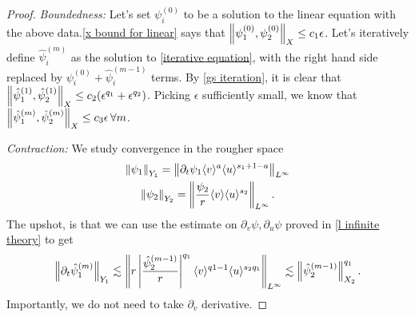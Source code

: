 \documentclass[11pt, oneside]{amsart}
\begin{document}
	\begin{proof}
		\textit{Boundedness:}
		Let's set $\psi_i^{(0)}$ to be a solution to the linear equation with the above data.\cref{x bound for linear} says that $\left\lVert \psi_1^{(0)},\psi_2^{(0)}\right\rVert_X\leq c_1\epsilon$. Let's iteratively define $\hat{\psi}^{(m)}_i$ as the solution to \eqref{iterative equation}, with the right hand side replaced by $\psi_i^{(0)}+\hat{\psi}_i^{(m-1)}$ terms. By \cref{gs iteration}, it is clear that $\left\lVert \hat{\psi}_1^{(1)},\hat{\psi}_2^{(1)}\right\rVert_X\leq c_2 (\epsilon^{q_1}+\epsilon^{q_2})$. Picking $\epsilon$ sufficiently small, we know that $\left\lVert \hat{\psi}_1^{(m)},\hat{\psi}_2^{(m)}\right\rVert_X\leq c_3\epsilon\,\forall m$.
		
		
		\textit{Contraction:} We study convergence in the rougher space
		\begin{equation*}
			\begin{gathered}
				\left\lVert \psi_1\right\rVert_{Y_1}=\left\lVert \partial_t\psi_1\langle v \rangle^{a}\langle u \rangle^{s_1+1-a}\right\rVert_{L^\infty}\\
				\left\lVert \psi_2\right\rVert_{Y_2}=\left\lVert \frac{\psi_2}{r}\langle v \rangle\langle u \rangle^{s_2}\right\rVert_{L^\infty}.
			\end{gathered}
		\end{equation*}
		The upshot, is that we can use the estimate on $\partial_v\psi,\partial_u\psi$ proved in \cref{l infinite theory} to get
		\begin{equation*}
			\begin{gathered}
				\left\lVert \partial_t\hat{\psi}_1^{(m)}\right\rVert_{Y_1}\lesssim\left\lVert r\left\lvert \frac{\hat{\psi}_2^{(m-1)}}{r}\right\rvert^{q_1}\langle v \rangle^{q1-1}\langle u \rangle^{s_2q_1}\right\rVert_{L^\infty}\lesssim\left\lVert \hat{\psi}^{(m-1)}_2\right\rVert_{X_2}^{q_1}.
			\end{gathered}
		\end{equation*}
		Importantly, we do not need to take $\partial_v$ derivative.
		

\end{proof}
\end{document}
